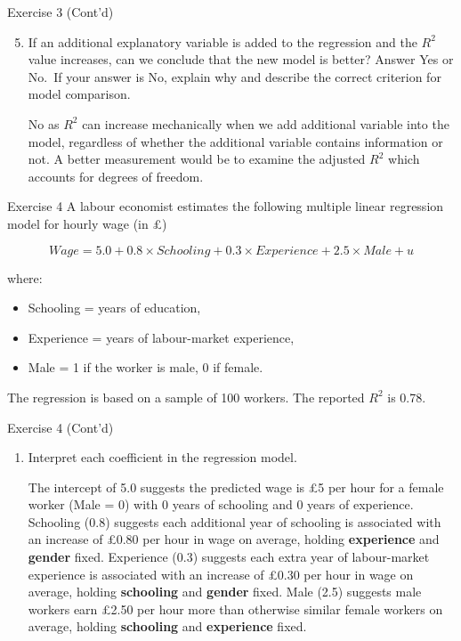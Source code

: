 \documentclass[
  ignorenonframetext,
  aspectratio=43,
]{beamer}
\let\olditem\item
\renewcommand\item{\olditem\justifying}
\begin{document}
\begin{frame}{Exercise 3 (Cont'd)}
\protect\hypertarget{exercise-3-contd-6}{}
\begin{enumerate}
\setcounter{enumi}{4}
\item
  If an additional explanatory variable is added to the regression and
  the \(R^2\) value increases, can we conclude that the new model is
  better? Answer Yes or No.~If your answer is No, explain why and
  describe the correct criterion for model comparison.

  \pause

  No as \(R^2\) can increase mechanically when we add additional
  variable into the model, regardless of whether the additional variable
  contains information or not. A better measurement would be to examine
  the adjusted \(R^2\) which accounts for degrees of freedom.
\end{enumerate}
\end{frame}

\begin{frame}{Exercise 4}
\protect\hypertarget{exercise-4}{}
A labour economist estimates the following multiple linear regression
model for hourly wage (in £) \vspace{-15pt}

\[
Wage=5.0+0.8 \times Schooling+0.3 \times Experience+2.5 \times Male+u 
\]

where:

\begin{itemize}
\item
  Schooling = years of education,
\item
  Experience = years of labour-market experience,
\item
  Male = 1 if the worker is male, 0 if female.
\end{itemize}

The regression is based on a sample of 100 workers. The reported \(R^2\)
is 0.78.
\end{frame}

\begin{frame}{Exercise 4 (Cont'd)}
\protect\hypertarget{exercise-4-contd}{}
\begin{enumerate}
\item
  Interpret each coefficient in the regression model.

  \pause

  The intercept of 5.0 suggests the predicted wage is £5 per hour for a
  female worker (Male = 0) with 0 years of schooling and 0 years of
  experience. Schooling (0.8) suggests each additional year of schooling
  is associated with an increase of £0.80 per hour in wage on average,
  holding \textbf{experience} and \textbf{gender} fixed. Experience
  (0.3) suggests each extra year of labour-market experience is
  associated with an increase of £0.30 per hour in wage on average,
  holding \textbf{schooling} and \textbf{gender} fixed. Male (2.5)
  suggests male workers earn £2.50 per hour more than otherwise similar
  female workers on average, holding \textbf{schooling} and
  \textbf{experience} fixed.
\end{enumerate}
\end{frame}
\end{document}
